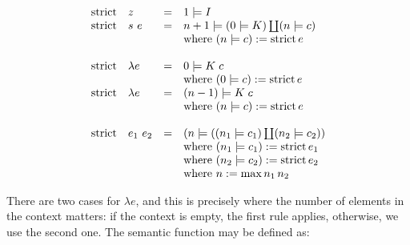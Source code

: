 \documentclass[conference]{IEEEtran}
\DeclareMathOperator{\strict}{strict}
\begin{document}
\begin{equation*}
    \begin{array}{l l l l}
        \strict & z         & = & 1 \models I                                              \\
        \strict & s \ e     & = & n+1 \models (0 \models K) \coprod (n \models c)          \\
                &           &   & \text{where } (n \models c) := \strict e                 \\
        \\
        \strict & \lambda e & = & 0 \models K \; c                                         \\
                &           &   & \text{where } (0 \models c) := \strict e                 \\
        \strict & \lambda e & = & (n-1) \models K \; c                                     \\
                &           &   & \text{where } (n \models c) := \strict e                 \\
        \\
        \strict & e_1 \ e_2 & = & (n \models ((n_1 \models c_1) \coprod (n_2 \models c_2)) \\
                &           &   & \text{where } (n_1 \models c_1) := \strict e_1           \\
                &           &   & \text{where } (n_2 \models c_2) := \strict e_2           \\
                &           &   & \text{where } n := \max n_1 \, n_2                       \\
    \end{array}
\end{equation*}

There are two cases for $\lambda e$, and this is precisely where the number of elements in the context matters:
if the context is empty, the first rule applies, otherwise, we use the second one.
The semantic function may be defined as:
\end{document}
